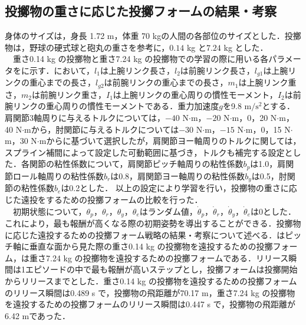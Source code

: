 \subsection{投擲物の重さに応じた投擲フォームの結果・考察}
身体のサイズは，身長 1.72 m，体重 70 kgの人間の各部位のサイズとした．投擲物は，野球の硬式球と砲丸の重さを参考に，$0.14$ kg\cite{horiuchi} と$7.24$ kg\cite{haq} とした．\\
　重さ0.14 kg の投擲物と重さ7.24 kg の投擲物での学習の際に用いる各パラメータをに示す\cite{irving}．において，$l_{1}$は上腕リンク長さ，$l_{2}$は前腕リンク長さ，$l_{g1}$は上腕リンクの重心までの長さ，$l_{g2}$は前腕リンクの重心までの長さ，$m_{1}$は上腕リンク重さ，$m_{2}$は前腕リンク重さ，$I_{1}$は上腕リンクの重心周りの慣性モーメント，$I_{2}$は前腕リンクの重心周りの慣性モーメントである．重力加速度$g$を9.8 $\mathrm{m/s^{2}}$とする．肩関節3軸周りに与えるトルクについては，$-40$ N$\cdot$m，$-20$ N$\cdot$m，0，20 N$\cdot$m，40 N$\cdot$mから，肘関節に与えるトルクについては$-30$ N$\cdot$m，$-15$ N$\cdot$m，0，15 N$\cdot$m，30 N$\cdot$mからに基づいて選択したが，肩関節ヨー軸周りのトルクに関しては，スプライン補間によって設定した可動範囲に基づき，トルクも補完する設定とした．各関節の粘性係数について，肩関節ピッチ軸周りの粘性係数$b_{p}$は1.0，肩関節ロール軸周りの粘性係数$b_{r}$は0.8，肩関節ヨー軸周りの粘性係数$b_{y}$は0.5，肘関節の粘性係数$b_{e}$は0.2とした．
以上の設定により学習を行い，投擲物の重さに応じた遠投をするための投擲フォームの比較を行った．\\
　初期状態について，$\theta_{p}$，$\theta_{r}$，$\theta_{y}$，$\theta_{e}$はランダム値，$\dot{\theta}_{p}$，$\dot{\theta}_{r}$，$\dot{\theta}_{y}$，$\dot{\theta}_{e}$は0とした．これにより，最も報酬が高くなる際の初期姿勢を導出することができる．投擲物に応じた遠投するための投擲フォーム戦略の結果・考察について述べる．はピッチ軸に垂直な面から見た際の重さ0.14 kg の投擲物を遠投するための投擲フォーム，は重さ7.24 kg の投擲物を遠投するための投擲フォームである．リリース瞬間は1エピソードの中で最も報酬が高いステップとし，投擲フォームは投擲開始からリリースまでとした．重さ0.14 kg の投擲物を遠投するための投擲フォームのリリース瞬間は0.489 s で，投擲物の飛距離が70.17 m，重さ7.24 kg の投擲物を遠投するための投擲フォームのリリース瞬間は0.447 s で，投擲物の飛距離が6.42 mであった．\\
